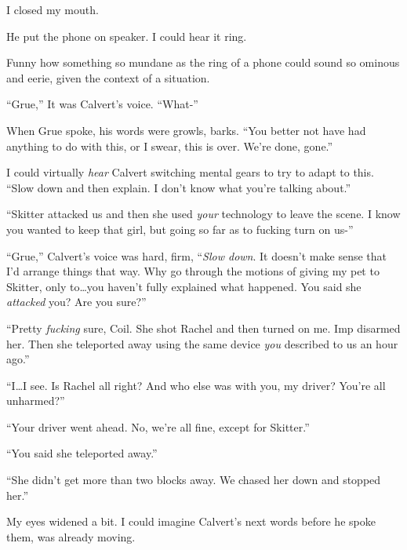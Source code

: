 I closed my mouth.



He put the phone on speaker.  I could hear it ring.



Funny how something so mundane as the ring of a phone could sound so ominous and eerie, given the context of a situation.



``Grue,'' It was Calvert's voice.  ``What-''



When Grue spoke, his words were growls, barks.  ``You better not have had anything to do with this, or I swear, this is over.  We're done, gone.''



I could virtually \emph{hear} Calvert switching mental gears to try to adapt to this.  ``Slow down and then explain.  I don't know what you're talking about.''



``Skitter attacked us and then she used \emph{your} technology to leave the scene.  I know you wanted to keep that girl, but going so far as to fucking turn on us-''



``Grue,'' Calvert's voice was hard, firm, ``\emph{Slow down}.  It doesn't make sense that I'd arrange things that way.  Why go through the motions of giving my pet to Skitter, only to\ldots you haven't fully explained what happened.  You said she \emph{attacked} you?  Are you sure?''



``Pretty \emph{fucking} sure, Coil.  She shot Rachel and then turned on me.  Imp disarmed her.  Then she teleported away using the same device \emph{you} described to us an hour ago.''



``I\ldots I see.  Is Rachel all right?  And who else was with you, my driver?  You're all unharmed?''



``Your driver went ahead.  No, we're all fine, except for Skitter.''



``You said she teleported away.''



``She didn't get more than two blocks away.  We chased her down and stopped her.''



My eyes widened a bit.  I could imagine Calvert's next words before he spoke them, was already moving.



